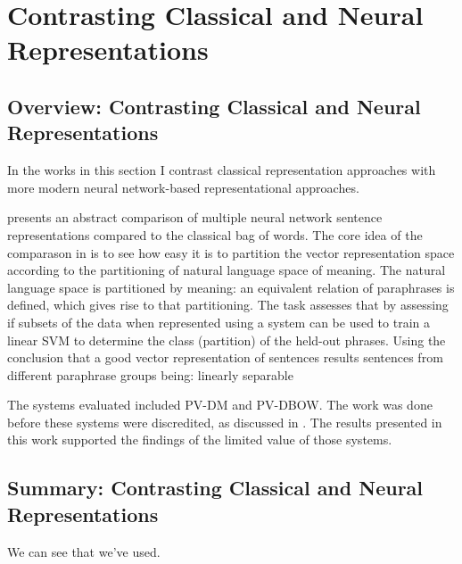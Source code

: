 \documentclass{book}
\begin{document}
\part{Contrasting Classical and Neural Representations}

\chapter{Overview: Contrasting Classical and Neural Representations}
In the works in this section I contrast classical representation approaches with more modern neural network-based representational approaches.

 presents an abstract comparison of multiple neural network sentence representations compared to the classical bag of words.
The core idea of the comparason in  is to see how easy it is to partition the vector representation space according to the partitioning of natural language space of meaning.
The natural language space is partitioned by meaning: an equivalent relation of paraphrases is defined, which gives rise to that partitioning.
The task assesses that by assessing if subsets of the data when represented using a system can be used to train a linear SVM to determine the class (partition) of the held-out phrases.
Using the conclusion that a good vector representation of sentences results sentences from different paraphrase groups being:
linearly separable



The systems evaluated included PV-DM and PV-DBOW.
The work was done before these systems were discredited, 
as discussed in .
The results presented in this work supported the findings of the limited value of those systems.




\label{SentVecMeaning}





\chapter{Summary: Contrasting Classical and Neural Representations}
We can see that we've used.
\end{document}
